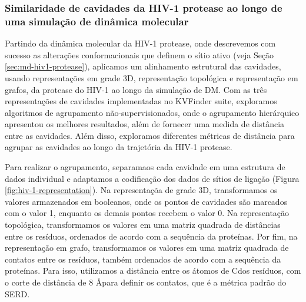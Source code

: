 \documentclass[Portugues]{phdquali}
\begin{document}
\subsubsection{Similaridade de cavidades da HIV-1 protease ao longo de uma simulação de dinâmica molecular}

Partindo da dinâmica molecular da HIV-1 protease, onde descrevemos com sucesso as alterações conformacionais que definem o sítio ativo (veja Seção \ref{sec:md-hiv1-protease}), aplicamos um alinhamento estrutural das cavidades, usando representações em grade 3D, representação topológica e representação em grafos, da protease do HIV-1 ao longo da simulação de DM. Com as três representações de cavidades implementadas no KVFinder suite, exploramos algoritmos de agrupamento não-supervisionados, onde o agrupamento hierárquico apresentou os melhores resultados, além de fornecer uma medida de distância entre as cavidades. Além disso, exploramos diferentes métricas de distância para agrupar as cavidades ao longo da trajetória da HIV-1 protease.

Para realizar o agrupamento, separamaos cada cavidade em uma estrutura de dados individual e adaptamos a codificação dos dados de sítios de ligação (Figura \ref{fig:hiv-1-representation}). Na representaçõa de grade 3D, transformamos os valores armazenados em booleanos, onde os pontos de cavidades são marcados com o valor 1, enquanto os demais pontos recebem o valor 0. Na representação topológica, transformamos os valores em uma matriz quadrada de distâncias entre os resíduos, ordenados de acordo com a sequência da proteínas. Por fim, na representação em grafo, transformamos os valores em uma matriz quadrada de contatos entre os resíduos, também ordenados de acordo com a sequência da proteínas. Para isso, utilizamos a distância entre os átomos de C\textbeta\space dos resíduos, com o corte de distância de 8 \AA para definir os contatos, que é a métrica padrão do SERD.
\end{document}
